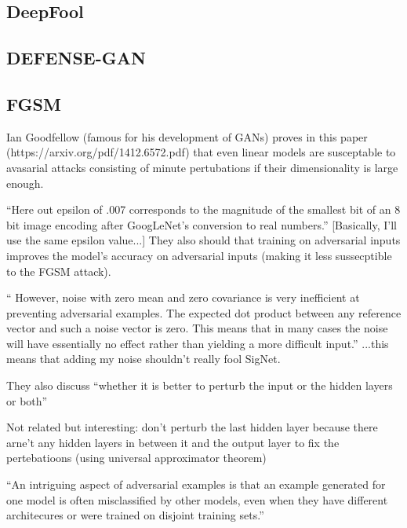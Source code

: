\subsection{DeepFool}
\subsection{DEFENSE-GAN}

\subsection{FGSM}
Ian Goodfellow (famous for his development of GANs) proves in this paper (https://arxiv.org/pdf/1412.6572.pdf) that even linear models are susceptable to avasarial attacks consisting of minute pertubations if their dimensionality is large enough.

``Here out epsilon of .007 corresponds to the magnitude of the
smallest bit of an 8 bit image encoding after GoogLeNet's conversion to real numbers.''
[Basically, I'll use the same epsilon value...]
They also should that training on adversarial inputs improves the model's accuracy on adversarial inputs (making it less sussecptible to the FGSM attack).

`` However, noise
with zero mean and zero covariance is very inefficient at preventing adversarial examples. The
expected dot product between any reference vector and such a noise vector is zero. This means that
in many cases the noise will have essentially no effect rather than yielding a more difficult input.''
...this means that adding my noise shouldn't really fool SigNet.

They also discuss ``whether it is better to perturb the input or the hidden layers or both''

Not related but interesting: don't perturb the last hidden layer because there arne't any hidden layers in between it and the output layer to fix the pertebatioons (using  universal approximator theorem)

``An intriguing aspect of adversarial examples is that an example generated for one model is often
misclassified by other models, even when they have different architecures or were trained on disjoint training sets.''
